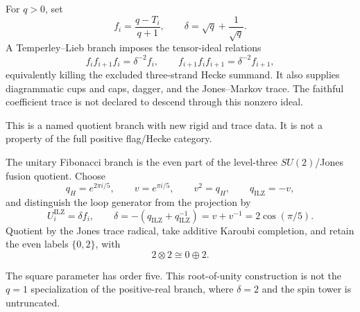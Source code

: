 \begin{definition}
For $q>0$, set
\[
 f_i=\frac{q-T_i}{q+1},\qquad
 \delta=\sqrt q+\frac1{\sqrt q}.
\]
A Temperley--Lieb branch imposes the tensor-ideal relations
\[
 f_if_{i+1}f_i=\delta^{-2}f_i,\qquad
 f_{i+1}f_if_{i+1}=\delta^{-2}f_{i+1},
\]
equivalently killing the excluded three-strand Hecke summand.  It also
supplies diagrammatic cups and caps, dagger, and the Jones--Markov trace.
The faithful coefficient trace is not declared to descend through this
nonzero ideal.
\end{definition}
\begin{scope}
This is a named quotient branch with new rigid and trace data.  It is not a
property of the full positive flag/Hecke category.
\end{scope}

\begin{definition}
The unitary Fibonacci branch is the even part of the level-three
$SU(2)$/Jones fusion quotient.  Choose
\[
 q_H=e^{2\pi i/5},\qquad v=e^{\pi i/5},\qquad v^2=q_H,
 \qquad q_{\mathrm{ILZ}}=-v,
\]
and distinguish the loop generator from the projection by
\[
 U_i^{\mathrm{ILZ}}=\delta f_i,\qquad
 \delta=-(q_{\mathrm{ILZ}}+q_{\mathrm{ILZ}}^{-1})
       =v+v^{-1}=2\cos(\pi/5).
\]
Quotient by the Jones trace radical, take additive Karoubi completion, and
retain the even labels $\{0,2\}$, with
\[
 2\otimes2\cong0\oplus2.
\]
\end{definition}
\begin{scope}
The square parameter has order five.  This root-of-unity construction is
not the $q=1$ specialization of the positive-real branch, where $\delta=2$
and the spin tower is untruncated.
\end{scope}

